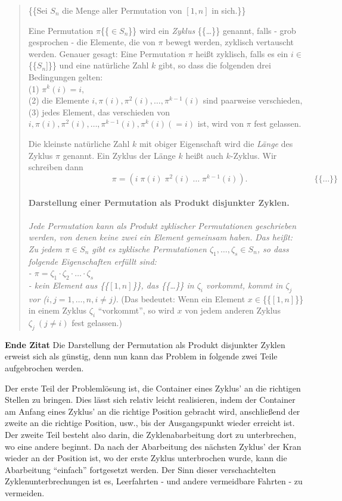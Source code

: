 \begin{quotation}
\{\{Sei $S_n$ die Menge aller Permutation von $[1,n]$ in sich.\}\}

Eine Permutation $\pi$\{\{$\in S_n$\}\} wird ein \emph{Zyklus} \{\{\dots\}\} genannt, falls - grob gesprochen - die Elemente, die von $\pi$ bewegt werden,
zyklisch vertauscht werden. Genauer gesagt: Eine Permutation $\pi$ heißt zyklisch,
falls es ein $i \in $\{\{$S_n$]\}\} und eine natürliche Zahl $k$ gibt, so dass die folgenden drei Bedingungen gelten:\\
(1) $\pi^k(i) = i$, \\
(2) die Elemente $i,\pi(i),\pi^2(i),\dots,\pi^{k-1}(i)$ sind paarweise verschieden, \\
(3) jedes Element, das verschieden von $i,\pi(i),\pi^2(i),\dots,\pi^{k-1}(i), \pi^k(i) (=i)$ ist, wird von $\pi$ fest gelassen.

Die kleinste natürliche Zahl $k$ mit obiger Eigenschaft wird die \emph{Länge} des Zyklus $\pi$ genannt.
Ein Zyklus der Länge $k$ heißt auch $k$-Zyklus. Wir schreiben dann \[\hspace{10em} \pi=(i\;\pi(i)\;\pi^2(i) \; \dots \;\pi^{k-1}(i)). \hspace{8em} \{\{\dots\}\}\]

\paragraph{Darstellung einer Permutation als Produkt disjunkter Zyklen.}
\emph{Jede Permutation kann als Produkt zyklischer Permutationen geschrieben werden, von denen keine zwei ein Element gemeinsam haben.}
\emph{Das heißt: Zu jedem $\pi \in S_n$ gibt es zyklische Permutationen $\zeta_1,\dots,\zeta_s \in S_n$,
so dass folgende Eigenschaften erfüllt sind: \\
 - $\pi=\zeta_1\cdot \zeta_2 \cdot \ldots \cdot \zeta_s$ \\
 - kein Element aus \{\{$[1,n]$\}\}, das \{\{\dots\}\} in $\zeta_i$ vorkommt, kommt in $\zeta_j$ vor ($i,j=1, \dots,n, i \neq j$).}
(Das bedeutet: Wenn ein Element $x \in$\{\{$[1,n]$\}\} in einem Zyklus $\zeta_i$ ``vorkommt'',
 so wird $x$ von jedem anderen Zyklus $\zeta_j \: (j \neq i)$ fest gelassen.)
\end{quotation}
\nopagebreak[4]
\textbf{Ende Zitat}
\vfill
\clearpage
Die Darstellung der Permutation als Produkt disjunkter Zyklen erweist sich als günstig,
denn nun kann das Problem in folgende zwei Teile aufgebrochen werden.

Der erste Teil der Problemlösung ist, die Container eines Zyklus' an die richtigen Stellen zu bringen.
Dies lässt sich relativ leicht realisieren, indem der Container am Anfang eines Zyklus' an die richtige Position gebracht wird,
anschließend der zweite an die richtige Position, usw., bis der Ausgangspunkt wieder erreicht ist.
Der zweite Teil besteht also darin, die Zyklenabarbeitung dort zu unterbrechen, wo eine andere beginnt.
Da nach der Abarbeitung des nächsten Zyklus' der Kran wieder an der Position ist,
wo der erste Zyklus unterbrochen wurde, kann die Abarbeitung ``einfach'' fortgesetzt werden.
Der Sinn dieser verschachtelten Zyklenunterbrechungen ist es, Leerfahrten - und andere vermeidbare Fahrten - zu vermeiden.


